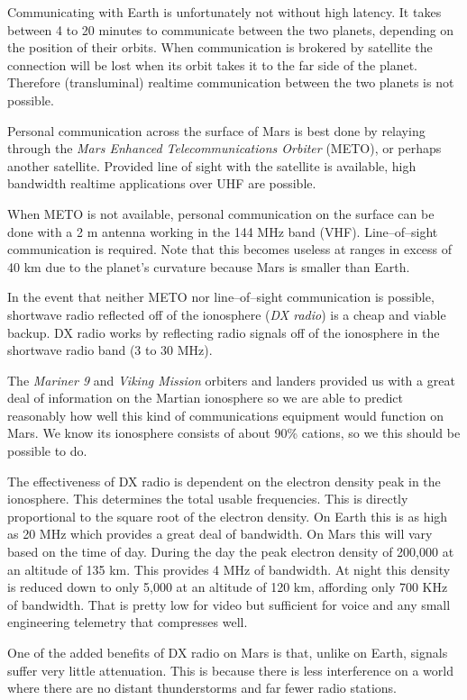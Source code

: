 
Communicating with Earth is unfortunately not without high latency. It takes between 4 to 20 minutes to communicate between the two planets, depending on the position of their orbits. When communication is brokered by satellite the connection will be lost when its orbit takes it to the far side of the planet. Therefore (transluminal) realtime communication between the two planets is not possible.

Personal communication across the surface of Mars is best done by relaying through the {\it Mars Enhanced Telecommunications Orbiter} (METO), or perhaps another satellite. Provided line of sight with the satellite is available, high bandwidth realtime applications over UHF are possible.

When METO is not available, personal communication on the surface can be done with a 2 m antenna working in the 144 MHz band (VHF). Line--of--sight communication is required. Note that this becomes useless at ranges in excess of 40 km due to the planet's curvature because Mars is smaller than Earth.

In the event that neither METO nor line--of--sight communication is possible, shortwave radio reflected off of the ionosphere ({\it DX radio}) is a cheap and viable backup. DX radio works by reflecting radio signals off of the ionosphere in the shortwave radio band (3 to 30 MHz). 

The {\it Mariner 9} and {\it Viking Mission} orbiters and landers provided us with a great deal of information on the Martian ionosphere so we are able to predict reasonably how well this kind of communications equipment would function on Mars. We know its ionosphere consists of about 90\%  cations, so we this should be possible to do.

The effectiveness of DX radio is dependent on the electron density peak in the ionosphere. This determines the total usable frequencies. This is directly proportional to the square root of the electron density. On Earth this is as high as 20 MHz which provides a great deal of bandwidth. On Mars this will vary based on the time of day. During the day the peak electron density of 200,000  at an altitude of 135 km. This provides 4 MHz of bandwidth. At night this density is reduced down to only 5,000  at an altitude of 120 km, affording only 700 KHz of bandwidth. That is pretty low for video but sufficient for voice and any small engineering telemetry that compresses well.

One of the added benefits of DX radio on Mars is that, unlike on Earth, signals suffer very little attenuation. This is because there is less interference on a world where there are no distant thunderstorms and far fewer radio stations.

